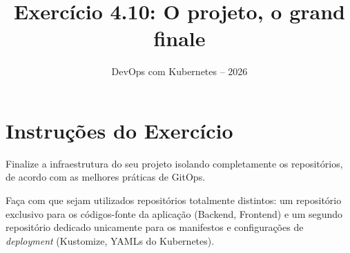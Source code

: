 \documentclass[11pt,a4paper]{article}
\title{\color{secondary}\Huge\textbf{Exercício 4.10: O projeto, o grand finale}}
\author{\color{primary}DevOps com Kubernetes -- 2026}
\date{}
\begin{document}
\maketitle

\section*{\color{primary}Instruções do Exercício}
\begin{tcolorbox}[colback=blue!5!white,colframe=blue!75!black,title=Exercício 4.10: O projeto, o grand finale]
Finalize a infraestrutura do seu projeto isolando completamente os repositórios, de acordo com as melhores práticas de GitOps.

Faça com que sejam utilizados repositórios totalmente distintos: um repositório exclusivo para os códigos-fonte da aplicação (Backend, Frontend) e um segundo repositório dedicado unicamente para os manifestos e configurações de \textit{deployment} (Kustomize, YAMLs do Kubernetes).
\end{tcolorbox}
\end{document}
